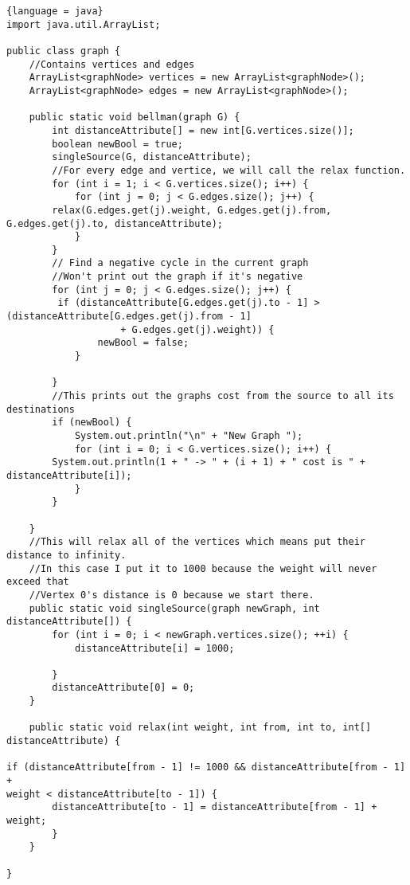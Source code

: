 \documentclass{article}
\begin{document}
\begin{lstlisting}{language = java}
import java.util.ArrayList;

public class graph {
    //Contains vertices and edges
    ArrayList<graphNode> vertices = new ArrayList<graphNode>();
    ArrayList<graphNode> edges = new ArrayList<graphNode>();

    public static void bellman(graph G) {
        int distanceAttribute[] = new int[G.vertices.size()];
        boolean newBool = true;
        singleSource(G, distanceAttribute);
        //For every edge and vertice, we will call the relax function.
        for (int i = 1; i < G.vertices.size(); i++) {
            for (int j = 0; j < G.edges.size(); j++) {
        relax(G.edges.get(j).weight, G.edges.get(j).from, G.edges.get(j).to, distanceAttribute);
            }
        }
        // Find a negative cycle in the current graph
        //Won't print out the graph if it's negative
        for (int j = 0; j < G.edges.size(); j++) {
         if (distanceAttribute[G.edges.get(j).to - 1] > (distanceAttribute[G.edges.get(j).from - 1]
                    + G.edges.get(j).weight)) {
                newBool = false;
            }

        }
        //This prints out the graphs cost from the source to all its destinations
        if (newBool) {
            System.out.println("\n" + "New Graph ");
            for (int i = 0; i < G.vertices.size(); i++) {
        System.out.println(1 + " -> " + (i + 1) + " cost is " + distanceAttribute[i]);
            }
        }

    }
    //This will relax all of the vertices which means put their distance to infinity.
    //In this case I put it to 1000 because the weight will never exceed that
    //Vertex 0's distance is 0 because we start there.
    public static void singleSource(graph newGraph, int distanceAttribute[]) {
        for (int i = 0; i < newGraph.vertices.size(); ++i) {
            distanceAttribute[i] = 1000;

        }
        distanceAttribute[0] = 0;
    }
    
    public static void relax(int weight, int from, int to, int[] distanceAttribute) {

if (distanceAttribute[from - 1] != 1000 && distanceAttribute[from - 1] + 
weight < distanceAttribute[to - 1]) {
        distanceAttribute[to - 1] = distanceAttribute[from - 1] + weight;
        }
    }

}

\end{lstlisting}
\end{document}
